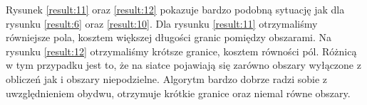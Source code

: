 Rysunek \ref{result:11} oraz \ref{result:12} pokazuje bardzo podobną sytuację jak dla rysunku \ref{result:6} oraz
\ref{result:10}.
Dla rysunku \ref{result:11} otrzymaliśmy równiejsze pola, kosztem większej długości granic pomiędzy obszarami.
Na rysunku \ref{result:12} otrzymaliśmy krótsze granice, kosztem równości pól.
Różnicą w tym przypadku jest to, że na siatce pojawiają się zarówno obszary wyłączone z obliczeń jak i
obszary niepodzielne.
Algorytm bardzo dobrze radzi sobie z uwzględnieniem obydwu, otrzymuje krótkie granice oraz niemal równe obszary.
\begin{figure}[h]
\centering
\begin{subfigure}{.33\textwidth}
    \centering
    \caption[short]{}
\end{subfigure}%
\begin{subfigure}{.33\textwidth}
    \centering
    \caption[short]{}
\end{subfigure}%

\end{figure}
